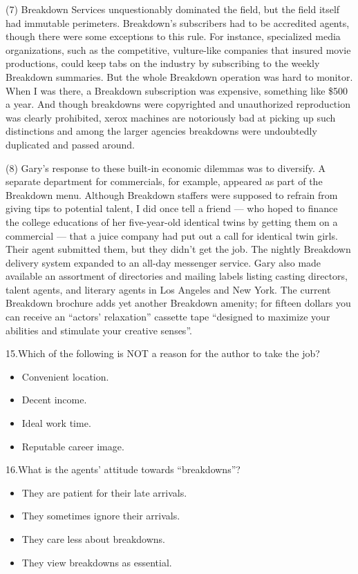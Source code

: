 \documentclass[UTF8,11pt]{ctexart}
\begin{document}
(7) Breakdown Services unquestionably dominated the field, but the field itself had immutable perimeters. Breakdown’s subscribers had to be accredited agents, though there were some exceptions to this rule. For instance, specialized media organizations, such as the competitive, vulture-like companies that insured movie productions, could keep tabs on the industry by subscribing to the weekly Breakdown summaries. But the whole Breakdown operation was hard to monitor. When I was there, a Breakdown subscription was expensive, something like \$500 a year. And though breakdowns were copyrighted and unauthorized reproduction was clearly prohibited, xerox machines are notoriously bad at picking up such distinctions and among the larger agencies breakdowns were undoubtedly duplicated and passed around.


(8) Gary’s response to these built-in economic dilemmas was to diversify. A separate department for commercials, for example, appeared as part of the Breakdown menu. Although Breakdown staffers were supposed to refrain from giving tips to potential talent, I did once tell a friend — who hoped to finance the college educations of her five-year-old identical twins by getting them on a commercial — that a juice company had put out a call for identical twin girls. Their agent submitted them, but they didn’t get the job. The nightly Breakdown delivery system expanded to an all-day messenger service. Gary also made available an assortment of directories and mailing labels listing casting directors, talent agents, and literary agents in Los Angeles and New York. The current Breakdown brochure adds yet another Breakdown amenity; for fifteen dollars you can receive an “actors’ relaxation” cassette tape “designed to maximize your abilities and stimulate your creative senses”.


15.Which of the following is NOT a reason for the author to take the job?


\begin{itemize}[leftmargin=2em,itemsep=.2em,topsep=.4em]\item[A.] Convenient location.
\item[B.] Decent income.
\item[C.] Ideal work time.
\item[D.] Reputable career image.
\end{itemize}

16.What is the agents’ attitude towards “breakdowns”?


\begin{itemize}[leftmargin=2em,itemsep=.2em,topsep=.4em]\item[A.] They are patient for their late arrivals.
\item[B.] They sometimes ignore their arrivals.
\item[C.] They care less about breakdowns.
\item[D.] They view breakdowns as essential.
\end{itemize}
\end{document}
